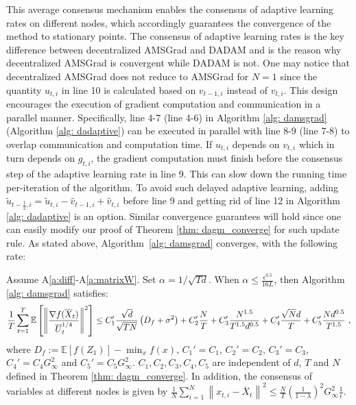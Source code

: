 \documentclass[anon,12pt]{colt2021} %
\begin{document}
This average consensus mechanism enables the consensus of adaptive learning rates on different nodes, which accordingly guarantees the convergence of the method to stationary points. 
The consensus of adaptive learning rates is the key difference between decentralized AMSGrad and DADAM and is the reason why decentralized AMSGrad is  convergent while DADAM is not.
One may notice that decentralized AMSGrad does not reduce to AMSGrad for $N=1$ since the quantity $u_{t,i}$ in line 10 is calculated based on $v_{t-1,i}$ instead of $v_{t,i}$.
This design encourages the execution of gradient computation and communication in a parallel manner. 
Specifically, line 4-7 (line 4-6) in Algorithm \ref{alg: damsgrad} (Algorithm \ref{alg: dadaptive}) can be executed in parallel with line 8-9 (line 7-8) to overlap communication and computation time. 
If $u_{t,i}$ depends on $v_{t,i}$ which in turn depends on $g_{t,i}$, the gradient computation must finish before the consensus step of the adaptive learning rate in line 9. 
This can slow down the running time per-iteration of the algorithm. 
To avoid such delayed adaptive learning, adding $\tilde u_{t-\frac{1}{2},i} = \tilde u_{t,i} - \hat v_{t-1,i} + \hat v_{t,i}$ before line 9 and getting rid of line 12 in Algorithm \ref{alg: dadaptive} is an option.
Similar convergence guarantees will hold since one can easily modify our proof of Theorem \ref{thm: dagm_converge} for such update rule. 
As stated above, Algorithm~\ref{alg: damsgrad} converges, with the following rate:


\begin{boxtheo}\label{thm: dams_converge}
Assume A\ref{a:diff}-A\ref{a:matrixW}.
Set $\alpha = 1/\sqrt{Td}$. When $\alpha  \leq \frac{\epsilon^{0.5}}{16L} $, then Algorithm \ref{alg: damsgrad} satisfies:
 {\small
	  \begin{align}\notag
	   \frac{1}{T}\sum_{t=1}^T  \mathbb E \left [\left\|\frac{\nabla f( \overline X_{t})}{\overline U_{t}^{1/4}}\right\|^2  \right]
	  \leq  C_1' \frac{\sqrt{d}}{\sqrt{TN}} \left(D_f +    \sigma^2 \right) +  C_2' \frac{N}{T}  +  C_3' \frac{N^{1.5}}{T^{1.5}d^{0.5}} 
+  C_4' \frac{\sqrt{N}d}{T} +  C_5'  \frac{Nd^{0.5}}{T^{1.5}}  \ ,
	  \end{align}
} where $D_f := \mathbb E  [f( Z_{1})]  -  \min_x  f(x)$, $C_1' = C_1$, $C_2' = C_2$, $C_3' = C_3$, $C_4' = C_4G_{\infty}^2$ and $C_5' = C_5 G_{\infty}^2 $. $C_1,C_2, C_3, C_4, C_5$ are independent of $d$, $T$ and $N$ defined in Theorem \ref{thm: dagm_converge}. In addition, the consensus of variables at different nodes is given by $\frac{1}{N}\sum_{i=1}^N\left\| {  x_{t,i} -   \overline X_{t}}  \right\|^2   \leq \frac{N}{T} \left (\frac{1}{1-\lambda} \right)^2  G_{\infty}^2 \frac{1}{\epsilon}$. 
\end{boxtheo}
\end{document}
